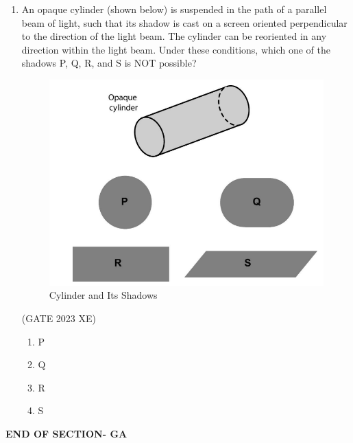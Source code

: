 \documentclass[journal,12pt,onecolumn]{IEEEtran}
\begin{document}
\begin{enumerate}
\begin{multicols}{4}
\end{multicols}



\item An opaque cylinder (shown below) is suspended in the path of a parallel beam of 
light, such that its shadow is cast on a screen oriented perpendicular to the 
direction of the light beam. The cylinder can be reoriented in any direction within 
the light beam. Under these conditions, which one of the shadows P, Q, R, and S 
is NOT possible?

\begin{figure}[htbp]

\centering

\includegraphics[width=.4\columnwidth]{figs/GA/fig3.png}

\caption{Cylinder and Its Shadows}

\label{fig:figs/GA/fig3.png}

\end{figure}

\hfill{(GATE 2023 XE)}

\begin{multicols}{4}

\begin{enumerate}

\item P

\item Q

\item R

\item S

\end{enumerate}

\end{multicols}

\end{enumerate}

\begin{center}

\item[\textbf{END OF SECTION- GA}]

\end{center}
\end{document}
